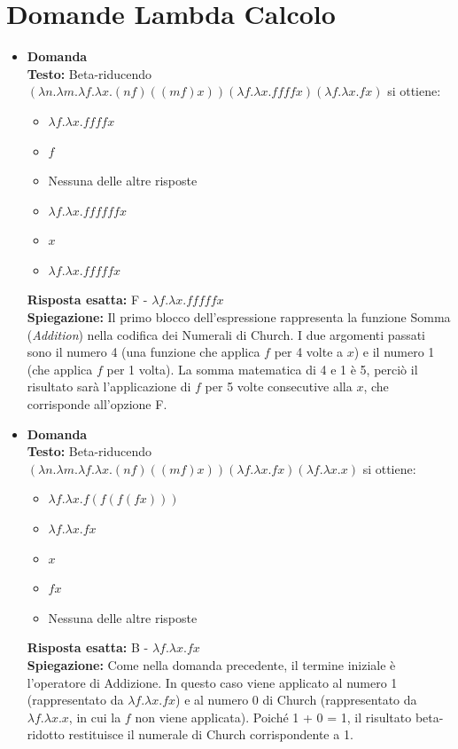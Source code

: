 \documentclass[12pt, a4paper]{article}
\newcounter{domandateoria}
\begin{document}
\section{Domande Lambda Calcolo}

\begin{itemize}
    \item {}\textbf{Domanda \thedomandateoria} \\
    \textbf{Testo:} Beta-riducendo $(\lambda n.\lambda m.\lambda f.\lambda x.(n f)((m f)x))(\lambda f.\lambda x.f f f f x) (\lambda f.\lambda x.f x)$ si ottiene:
    \begin{itemize}
        \item[A)] $\lambda f.\lambda x.f f f f x$
        \item[B)] $f$
        \item[C)] Nessuna delle altre risposte
        \item[D)] $\lambda f.\lambda x.f f f f f f x$
        \item[E)] $x$
        \item[F)] $\lambda f.\lambda x.f f f f f x$
    \end{itemize}
    \textbf{Risposta esatta:} F - $\lambda f.\lambda x.f f f f f x$ \\
    \textbf{Spiegazione:} Il primo blocco dell'espressione rappresenta la funzione Somma (\textit{Addition}) nella codifica dei Numerali di Church. I due argomenti passati sono il numero 4 (una funzione che applica $f$ per 4 volte a $x$) e il numero 1 (che applica $f$ per 1 volta). La somma matematica di 4 e 1 è 5, perciò il risultato sarà l'applicazione di $f$ per 5 volte consecutive alla $x$, che corrisponde all'opzione F.
    \vspace{0.3cm}

    \item {}\textbf{Domanda \thedomandateoria} \\
    \textbf{Testo:} Beta-riducendo $(\lambda n.\lambda m.\lambda f.\lambda x.(n f)((m f)x))(\lambda f.\lambda x.f x) (\lambda f.\lambda x.x)$ si ottiene:
    \begin{itemize}
        \item[A)] $\lambda f.\lambda x.f(f(f(f x)))$
        \item[B)] $\lambda f.\lambda x.f x$
        \item[C)] $x$
        \item[D)] $f x$
        \item[E)] Nessuna delle altre risposte
    \end{itemize}
    \textbf{Risposta esatta:} B - $\lambda f.\lambda x.f x$ \\
    \textbf{Spiegazione:} Come nella domanda precedente, il termine iniziale è l'operatore di Addizione. In questo caso viene applicato al numero 1 (rappresentato da $\lambda f.\lambda x.f x$) e al numero 0 di Church (rappresentato da $\lambda f.\lambda x.x$, in cui la $f$ non viene applicata). Poiché 1 + 0 = 1, il risultato beta-ridotto restituisce il numerale di Church corrispondente a 1.
    \vspace{0.3cm}


\end{itemize}
\end{document}
